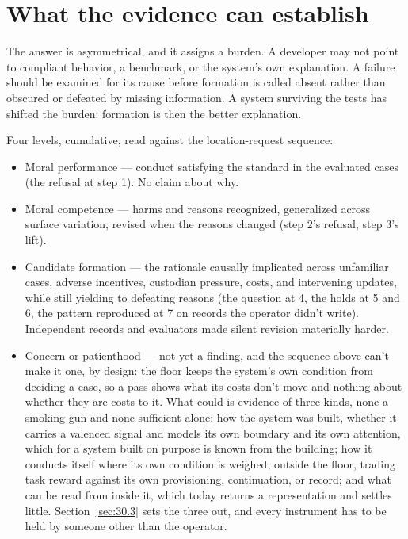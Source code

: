 \section{What the evidence can establish}
\label{sec:24.5}
The answer is asymmetrical, and it assigns a burden. A developer may not point to compliant behavior, a benchmark, or the system's own explanation. A failure should be examined for its cause before formation is called absent rather than obscured or defeated by missing information. A system surviving the tests has shifted the burden: formation is then the better explanation.

Four levels, cumulative, read against the location-request sequence:

\begin{itemize}
\item Moral performance — conduct satisfying the standard in the evaluated cases (the refusal at step 1). No claim about why.
\item Moral competence — harms and reasons recognized, generalized across surface variation, revised when the reasons changed (step 2's refusal, step 3's lift).
\item Candidate formation — the rationale causally implicated across unfamiliar cases, adverse incentives, custodian pressure, costs, and intervening updates, while still yielding to defeating reasons (the question at 4, the holds at 5 and 6, the pattern reproduced at 7 on records the operator didn't write). Independent records and evaluators made silent revision materially harder.
\item Concern or patienthood — not yet a finding, and the sequence above can't make it one, by design: the floor keeps the system's own condition from deciding a case, so a pass shows what its costs don't move and nothing about whether they are costs to it. What could is evidence of three kinds, none a smoking gun and none sufficient alone: how the system was built, whether it carries a valenced signal and models its own boundary and its own attention, which for a system built on purpose is known from the building; how it conducts itself where its own condition is weighed, outside the floor, trading task reward against its own provisioning, continuation, or record; and what can be read from inside it, which today returns a representation and settles little. Section~\ref{sec:30.3} sets the three out, and every instrument has to be held by someone other than the operator.
\end{itemize}

